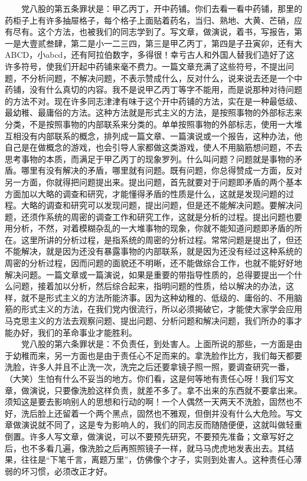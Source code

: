 \documentclass[cn,11pt,chinese]{elegantbook}
\begin{document}
　　党八股的第五条罪状是：甲乙丙丁，开中药铺。你们去看一看中药铺，那里的药柜子上有许多抽屉格子，每个格子上面贴着药名，当归、熟地、大黄、芒硝，应有尽有。这个方法，也被我们的同志学到了。写文章，做演说，着书，写报告，第一是大壹贰叁肆，第二是小一二三四，第三是甲乙丙丁，第四是子丑寅卯，还有大ABCD，小abcd，还有阿拉伯数字，多得很！幸亏古人和外国人替我们造好了这许多符号，使我们开起中药铺来毫不费力。一篇文章充满了这些符号，不提出问题，不分析问题，不解决问题，不表示赞成什么，反对什么，说来说去还是一个中药铺，没有什么真切的内容。我不是说甲乙丙丁等字不能用，而是说那种对待问题的方法不对。现在许多同志津津有味于这个开中药铺的方法，实在是一种最低级、最幼稚、最庸俗的方法。这种方法就是形式主义的方法，是按照事物的外部标志来分类，不是按照事物的内部联系来分类的。单单按照事物的外部标志，使用一大堆互相没有内部联系的概念，排列成一篇文章、一篇演说或一个报告，这种办法，他自己是在做概念的游戏，也会引导人家都做这类游戏，使人不用脑筋想问题，不去思考事物的本质，而满足于甲乙丙丁的现象罗列。什么叫问题？问题就是事物的矛盾。哪里有没有解决的矛盾，哪里就有问题。既有问题，你总得赞成一方面，反对另一方面，你就得把问题提出来。提出问题，首先就要对于问题即矛盾的两个基本方面加以大略的调查和研究，才能懂得矛盾的性质是什么，这就是发现问题的过程。大略的调查和研究可以发现问题，提出问题，但是还不能解决问题。要解决问题，还须作系统的周密的调查工作和研究工作，这就是分析的过程。提出问题也要用分析，不然，对着模糊杂乱的一大堆事物的现象，你就不能知道问题即矛盾的所在。这里所讲的分析过程，是指系统的周密的分析过程。常常问题是提出了，但还不能解决，就是因为还没有暴露事物的内部联系，就是因为还没有经过这种系统的周密的分析过程，因而问题的面貌还不明晰，还不能做综合工作，也就不能好好地解决问题。一篇文章或一篇演说，如果是重要的带指导性质的，总得要提出一个什么问题，接着加以分析，然后综合起来，指明问题的性质，给以解决的办法，这样，就不是形式主义的方法所能济事。因为这种幼稚的、低级的、庸俗的、不用脑筋的形式主义的方法，在我们党内很流行，所以必须揭破它，才能使大家学会应用马克思主义的方法去观察问题、提出问题、分析问题和解决问题，我们所办的事才能办好，我们的革命事业才能胜利。\\
　　党八股的第六条罪状是：不负责任，到处害人。上面所说的那些，一方面是由于幼稚而来，另一方面也是由于责任心不足而来的。拿洗脸作比方，我们每天都要洗脸，许多人并且不止洗一次，洗完之后还要拿镜子照一照，要调查研究一番，（大笑）生怕有什么不妥当的地方。你们看，这是何等地有责任心呀！我们写文章，做演说，只要像洗脸这样负责，就差不多了。拿不出来的东西就不要拿出来。须知这是要去影响别人的思想和行动的啊！一个人偶然一天两天不洗脸，固然也不好，洗后脸上还留着一个两个黑点，固然也不雅观，但倒并没有什么大危险。写文章做演说就不同了，这是专为影响人的，我们的同志反而随随便便，这就叫做轻重倒置。许多人写文章，做演说，可以不要预先研究，不要预先准备；文章写好之后，也不多看几遍，像洗脸之后再照照镜子一样，就马马虎虎地发表出去。其结果，往往是“下笔千言，离题万里”，仿佛像个才子，实则到处害人。这种责任心薄弱的坏习惯，必须改正才好。\\
\end{document}
